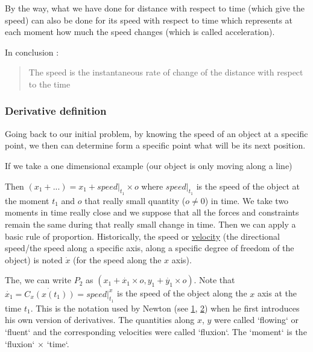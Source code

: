 \documentclass[12pt]{article}
\begin{document}
By the way, what we have done for distance with respect to time (which give the speed) can also be done for its speed with respect to time which represents at each moment how much the speed changes (which is called acceleration).

\bigskip 

In conclusion :

\begin{quote}
    The speed is the instantaneous rate of change of the distance with respect to the time
\end{quote}

\subsubsection{Derivative definition}


Going back to our initial problem, by knowing the speed of an object at a specific point, we then can determine form a specific point what will be its next position.

If we take a one dimensional example (our object is only moving along a line)


\begin{figure}[H]
 \centering
 
\end{figure}


Then $(x_1+...) = x_1 + speed|_{t_1} \times o$ where $speed|_{t_1}$ is the speed of the object at the moment $t_1$ and $o$ that really small quantity ($o \neq 0$) in time. We take two moments in time really close and we suppose that all the forces and constraints remain the same during that really small change in time. Then we can apply a basic rule of proportion. Historically, the speed or \href{https://en.wikipedia.org/wiki/Velocity}{velocity} (the directional speed/the speed along a specific axis, along a specific degree of freedom of the object) is noted $\dot{x}$ (for the speed along the $x$ axis).


The, we can write $P_2$ as $(x_1 + \dot{x_1} \times o, y_1 + \dot{y_1} \times o)$. Note that $\dot{x_1} = \dot{C_x(x(t_1))} = speed|^x_{t_1}$ is the speed of the object along the $x$ axis at the time $t_1$. This is the notation used by Newton (see \href{http://www.sfu.ca/~rpyke/fluxions.pdf}{1}, \href{https://www.youtube.com/watch?v=i5TFXyI4UMM&ab_channel=Mathoma}{2}) when he first introduces his own version of derivatives. The quantities along $x$, $y$ were called `flowing` or `fluent` and the corresponding velocities were called `fluxion`. The `moment` is the `fluxion` $\times$ `time`.
\end{document}
